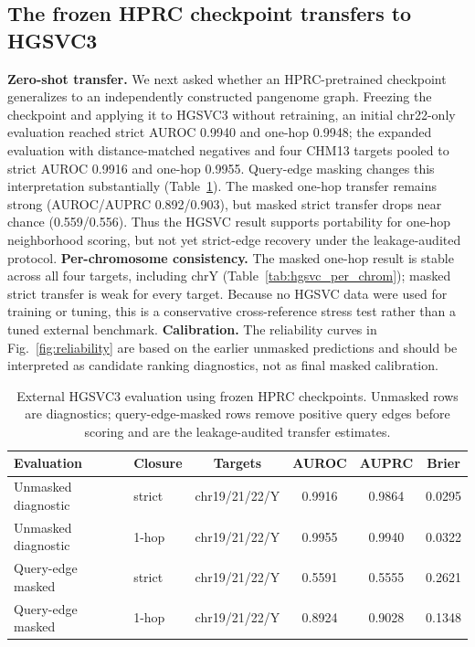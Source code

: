 \IfFileExists{ws-procs11x85.cls}{\worldscientificclasstrue\documentclass{ws-procs11x85}}{\worldscientificclassfalse\documentclass[11pt]{article}\usepackage[margin=1in]{geometry}}
\providecommand{\tbl}[2]{\caption{#1}#2}
\providecommand{\toprule}{\hline}
\providecommand{\colrule}{\hline}
\providecommand{\botrule}{\hline}
\begin{document}
\FloatBarrier

\subsection{The frozen HPRC checkpoint transfers to HGSVC3}

\textbf{Zero-shot transfer.} We next asked whether an HPRC-pretrained checkpoint
generalizes to an independently constructed pangenome graph. Freezing the
checkpoint and applying it to HGSVC3 without retraining, an initial chr22-only
evaluation reached strict AUROC 0.9940 and one-hop 0.9948; the expanded
evaluation with distance-matched negatives and four CHM13 targets pooled to
strict AUROC 0.9916 and one-hop 0.9955. Query-edge masking changes this
interpretation substantially (Table~\ref{tab:hgsvc_transfer}). The masked one-hop
transfer remains strong (AUROC/AUPRC 0.892/0.903), but masked strict transfer
drops near chance (0.559/0.556). Thus the HGSVC result supports portability for
one-hop neighborhood scoring, but not yet strict-edge recovery under the
leakage-audited protocol. \textbf{Per-chromosome consistency.} The masked one-hop
result is stable across all four targets, including chrY
(Table~\ref{tab:hgsvc_per_chrom}); masked strict transfer is weak for every
target. Because no HGSVC data were used for training or tuning, this is a
conservative cross-reference stress test rather than a tuned external benchmark.
\textbf{Calibration.} The reliability curves in Fig.~\ref{fig:reliability} are
based on the earlier unmasked predictions and should be interpreted as candidate
ranking diagnostics, not as final masked calibration.

\begin{table}[t]
\tbl{External HGSVC3 evaluation using frozen HPRC checkpoints. Unmasked rows are
diagnostics; query-edge-masked rows remove positive query edges before scoring
and are the leakage-audited transfer estimates.}
{\begin{tabular}{@{}llcccc@{}}
\toprule
Evaluation & Closure & Targets & AUROC & AUPRC & Brier\\
\colrule
Unmasked diagnostic & strict & chr19/21/22/Y & 0.9916 & 0.9864 & 0.0295\\
Unmasked diagnostic & 1-hop & chr19/21/22/Y & 0.9955 & 0.9940 & 0.0322\\
Query-edge masked & strict & chr19/21/22/Y & 0.5591 & 0.5555 & 0.2621\\
Query-edge masked & 1-hop & chr19/21/22/Y & 0.8924 & 0.9028 & 0.1348\\
\botrule
\end{tabular}}
\label{tab:hgsvc_transfer}
\end{table}
\end{document}
